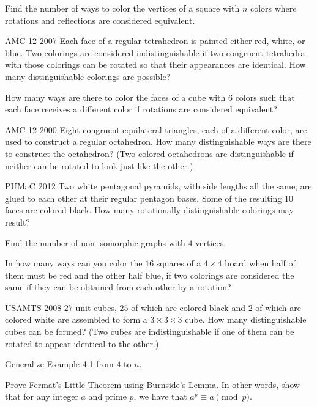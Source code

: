 \documentclass[11pt]{scrartcl}
\begin{document}
\begin{problem}[1]{}
Find the number of ways to color the vertices of a square with $n$ colors where rotations and reflections are considered equivalent.
\end{problem}
\begin{problem}[2]{AMC 12 2007}
Each face of a regular tetrahedron is painted either red, white, or blue. Two colorings are considered indistinguishable if two congruent tetrahedra with those colorings can be rotated so that their appearances are identical. How many distinguishable colorings are possible?
\end{problem}
\begin{problem}[3]{}
How many ways are there to color the faces of a cube with $6$ colors such that each face receives a different color if rotations are considered equivalent?
\end{problem}
\begin{problem}[4]{AMC 12 2000}
Eight congruent equilateral triangles, each of a different color, are used to construct a regular octahedron. How many distinguishable ways are there to construct the octahedron? (Two colored octahedrons are distinguishable if neither can be rotated to look just like the other.)
\end{problem}
\begin{problem}[5]{PUMaC 2012}
Two white pentagonal pyramids, with side lengths all the same, are glued to each other at their regular pentagon bases. Some of the resulting 10 faces are colored black. How many rotationally distinguishable colorings may result?
\end{problem}
\begin{problem}[6]{}
Find the number of non-isomorphic graphs with $4$ vertices.
\end{problem}
\begin{problem}[7]{}
In how many ways can you color the $16$ squares of a $4 \times 4$ board when half of them must be red and the other half blue, if two colorings are considered the same if they can be obtained from each other by a rotation?
\end{problem}
\begin{problem}[8]{USAMTS 2008}
$27$ unit cubes, $25$ of which are colored black and $2$ of which are colored white are assembled to form a $3 \times 3 \times 3$ cube. How many distinguishable cubes can be formed? (Two cubes are indistinguishable if one of them can be rotated to appear identical to the other.)
\end{problem}
\begin{problem}[9]{}
Generalize Example 4.1 from $4$ to $n$.
\end{problem}
\begin{problem}[10]{}
Prove Fermat's Little Theorem using Burnside's Lemma. In other words, show that for any integer $a$ and prime $p$, we have that $a^p \equiv a \pmod{p}$.
\end{problem}
\end{document}

